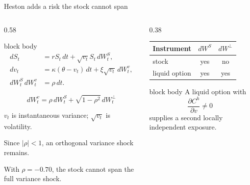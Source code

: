 
\begin{frame}{Heston adds a risk the stock cannot span}
  \begin{columns}[T,onlytextwidth]
    \begin{column}{0.58\textwidth}
      \begin{beamercolorbox}[rounded=true,sep=0.18cm]{block body}
        \[
          \begin{aligned}
          dS_t &= rS_t\,dt+\sqrt{v_t}S_t\,dW_t^S,\\
          dv_t &= \kappa(\theta-v_t)\,dt+\xi\sqrt{v_t}\,dW_t^v,\\
          dW_t^S\,dW_t^v&=\rho\,dt.
          \end{aligned}
        \]
      \end{beamercolorbox}

      \vspace{0.10cm}
      \[
        dW_t^v=\rho\,dW_t^S+\sqrt{1-\rho^2}\,dW_t^\perp
      \]

      \vspace{-0.06cm}
      {\small\begin{tightitemize}
        \item \(v_t\) is instantaneous variance; \(\sqrt{v_t}\) is volatility.
        \item Since \(|\rho|<1\), an orthogonal variance shock remains.
        \item With \(\rho=-0.70\), the stock cannot span the full variance shock.
      \end{tightitemize}}
    \end{column}

    \begin{column}{0.38\textwidth}
      {\scriptsize
      \renewcommand{\arraystretch}{1.25}
      \begin{tabular}{@{}lcc@{}}
        \toprule
        Instrument & \(dW^S\) & \(dW^\perp\)\\
        \midrule
        stock & yes & no\\
        liquid option & yes & yes\\
        \bottomrule
      \end{tabular}}

      \vspace{0.14cm}
      \begin{beamercolorbox}[rounded=true,sep=0.14cm]{block body}
        {\scriptsize A liquid option with
        \[
          \frac{\partial C^h}{\partial v}\neq 0
        \]
        supplies a second locally independent exposure.}
      \end{beamercolorbox}


\end{column}
\end{columns}
\end{frame}
